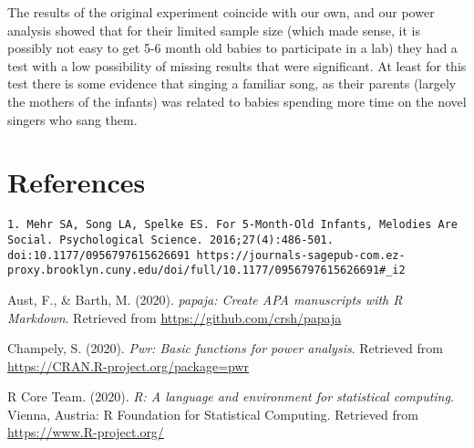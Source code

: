 \documentclass[
  english,
  man]{apa6}
\begin{document}
The results of the original experiment coincide with our own, and our power analysis showed that for their limited sample size (which made sense, it is possibly not easy to get 5-6 month old babies to participate in a lab) they had a test with a low possibility of missing results that were significant. At least for this test there is some evidence that singing a familiar song, as their parents (largely the mothers of the infants) was related to babies spending more time on the novel singers who sang them.

\newpage

\hypertarget{references}{%
\section{References}\label{references}}

\begin{verbatim}
1. Mehr SA, Song LA, Spelke ES. For 5-Month-Old Infants, Melodies Are Social. Psychological Science. 2016;27(4):486-501. doi:10.1177/0956797615626691 https://journals-sagepub-com.ez-proxy.brooklyn.cuny.edu/doi/full/10.1177/0956797615626691#_i2
\end{verbatim}

\begingroup
\setlength{\parindent}{-0.5in}
\setlength{\leftskip}{0.5in}

\hypertarget{refs}{}
\leavevmode\hypertarget{ref-R-papaja}{}%
Aust, F., \& Barth, M. (2020). \emph{papaja: Create APA manuscripts with R Markdown}. Retrieved from \url{https://github.com/crsh/papaja}

\leavevmode\hypertarget{ref-R-pwr}{}%
Champely, S. (2020). \emph{Pwr: Basic functions for power analysis}. Retrieved from \url{https://CRAN.R-project.org/package=pwr}

\leavevmode\hypertarget{ref-R-base}{}%
R Core Team. (2020). \emph{R: A language and environment for statistical computing}. Vienna, Austria: R Foundation for Statistical Computing. Retrieved from \url{https://www.R-project.org/}

\endgroup
\end{document}
